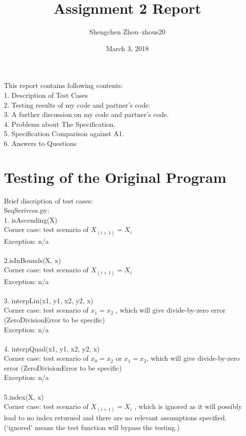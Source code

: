\documentclass[12pt]{article}
\title{Assignment 2 Report}
\author{Shengchen Zhou--zhous20}
\date{March 3, 2018}
\begin{document}
\maketitle

 This report contains following contents:\\
  1. Description of Test Cases\\
  2. Testing results of my code and partner's code.\\
  3.  A further discussion on my code and partner's code.\\
  4.  Problems about The Specification.\\
  5.  Specification Comparison against A1.\\
  6.  Answers to Questions

\section{Testing of the Original Program}
Brief discription of test cases:\\
\large SeqSerivces.py: \\
\normalsize 1. isAscending(X)\\
\phantom{xx}  Corner case: test scenario of $X_{(i+1)}=X_i$\\
\phantom{xx}  Exception: n/a\\
\\
2.isInBounds(X, x)\\
\phantom{xx}  Corner case: test scenario of $X_{(i+1)}=X_i$\\
\phantom{xx}  Exception: n/a\\
\\
3. interpLin(x1, y1, x2, y2, x)\\
\phantom{xx}  Corner case: test scenario of $x_1=x_2$ , which will give divide-by-zero error (ZeroDivisionError to be specific)\\
\phantom{xx}  Exception: n/a\\
\\
4. interpQuad(x1, y1, x2, y2, x)\\
\phantom{xx}  Corner case: test scenario of $x_0=x_2$ or $x_1=x_2$, which will give divide-by-zero error (ZeroDivisionError to be specific)\\
\phantom{xx}  Exception: n/a\\
\\
5.index(X, x)\\
\phantom{xx}  Corner case: test scenario of $X_{(i+1)}=X_i$ , which is ignored as it will possibly lead to no index returned and there are no relevant assumptions specified. (‘ignored’ means the test function will bypass the testing.)\\
\end{document}
